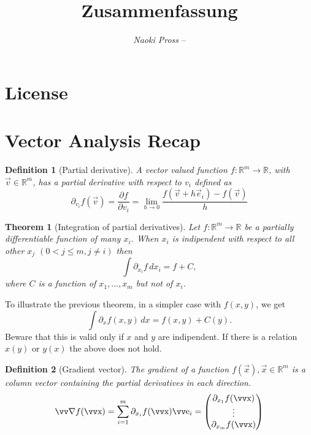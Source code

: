 \documentclass[margin=normal]{tex/hsrzf}
\author{\textsl{Naoki Pross} -- \texttt{\theauthoremail}}
\title{\texttt{\themodule} Zusammenfassung}
\date{\thesemester}
\theoremstyle{elmagzf}
\newtheorem{theorem}{Theorem}
\newtheorem{definition}{Definition}
\begin{document}

\maketitle


\tableofcontents

\section*{License}
\doclicenseThis

\clearpage
\twocolumn
\setcounter{page}{1}

\section{Vector Analysis Recap}

\begin{definition}[Partial derivative]
  A vector valued function \(f: \mathbb{R}^m\to\mathbb{R}\), with
  \(\vec{v}\in\mathbb{R}^m\), has a partial derivative with respect to \(v_i\)
  defined as
  \[
    \partial_{v_i} f(\vec{v})
      = \frac{\partial f}{\partial v_i}
      = \lim_{h\to 0} \frac{f(\vec{v} + h\vec{e}_i) - f(\vec{v})}{h}
  \]
\end{definition}

\begin{theorem}[Integration of partial derivatives]
  Let \(f: \mathbb{R}^m\to\mathbb{R}\) be a partially differentiable function
  of many \(x_i\). When \(x_i\) is \emph{indipendent} with respect to all other
  \(x_j\) \((0 < j \leq m, j \neq i)\) then
  \[
    \int \partial_{x_i} f \,d x_i = f + C,
  \]
  where \(C\) is a function of \(x_1, \ldots, x_m\) but not of \(x_i\).
\end{theorem}

To illustrate the previous theorem, in a simpler case with \(f(x,y)\), we get
\[
  \int \partial_x f(x,y) \,dx = f(x, y) + C(y).
\]
Beware that this is valid only if \(x\) and \(y\) are indipendent.
If there is a relation \(x(y)\) or \(y(x)\) the above does not hold.

\begin{definition}[Gradient vector]
  The \emph{gradient} of a function \(f(\vec{x}), \vec{x}\in\mathbb{R}^m\) is a
  column vector containing the partial derivatives
  in each direction.
  \[
    \grad f (\vec{x}) = \sum_{i=1}^m \partial_{x_i} f(\vec{x}) \vec{e}_i
      = \begin{pmatrix}
        \partial_{x_1} f(\vec{x}) \\
        \vdots \\
        \partial_{x_m} f(\vec{x}) \\
      \end{pmatrix}
  \]
\end{definition}
\end{document}
